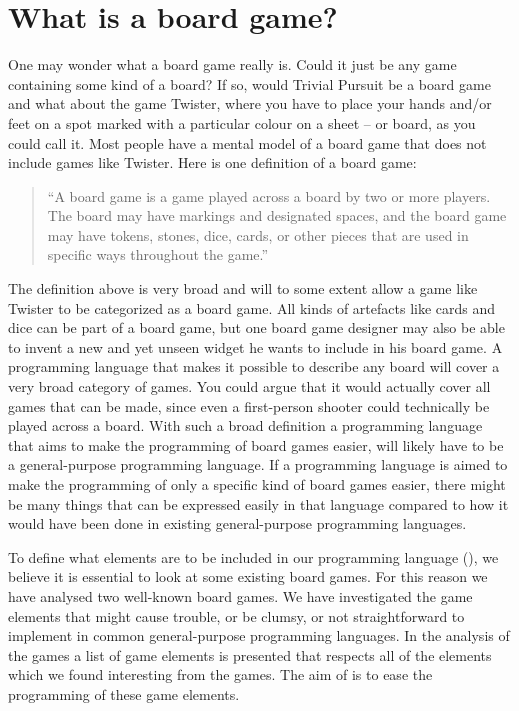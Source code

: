 \section{What is a board game?}
\label{sec:board-game-analysis}

One may wonder what a board game really is. Could it just be any game containing
some kind of a board? If so, would Trivial Pursuit be a board game and what
about the game Twister, where you have to place your hands and/or feet on a spot
marked with a particular colour on a sheet -- or board, as you could call it. Most
people have a mental model of a board game that does not include games like
Twister. Here is one definition of a board game:

\begin{quote}
  ``A board game is a game played across a board by two or more players. The
  board may have markings and designated spaces, and the board game may have
  tokens, stones, dice, cards, or other pieces that are used in specific ways
  throughout the game.''\cite{def-board-game}
\end{quote}

The definition above is very broad and will to some extent allow a game like
Twister to be categorized as a board game. All kinds of artefacts like cards and
dice can be part of a board game, but one board game designer may also be able
to invent a new and yet unseen widget he wants to include in his board
game. A programming language that makes it possible to describe any board will
cover a very broad category of games. You could argue that it would actually
cover all games that can be made, since even a first-person shooter could
technically be played across a board. With such a broad definition a
programming language that aims to make the programming of board games easier,
will likely have to be a general-purpose programming language. If a programming
language is aimed to make the programming of only a specific kind of board games
easier, there might be many things that can be expressed easily in that language
compared to how it would have been done in existing general-purpose programming
languages.

To define what elements are to be included in our programming language
(\productname{}), we believe it is essential to look at some existing board
games.  For this reason we have analysed two well-known board games. We have
investigated the game elements that might cause trouble, or be clumsy, or not
straightforward to implement in common general-purpose programming languages. In
the analysis of the games a list of game elements is presented that respects all
of the elements which we found interesting from the games. The aim of
\productname{} is to ease the programming of these game elements.


